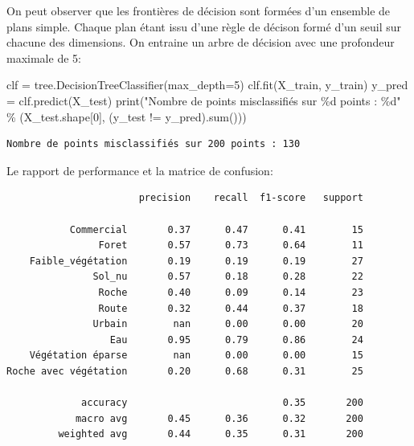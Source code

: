 \documentclass[
  11pt,
  letterpaper,
  open=any,
  twoside=false,
  french]{scrbook}
\newenvironment{Shaded}{\begin{snugshade}}{\end{snugshade}}
\newcommand{\BuiltInTok}[1]{\textcolor[rgb]{0.00,0.23,0.31}{#1}}
\newcommand{\DecValTok}[1]{\textcolor[rgb]{0.68,0.00,0.00}{#1}}
\newcommand{\NormalTok}[1]{\textcolor[rgb]{0.00,0.23,0.31}{#1}}
\newcommand{\OperatorTok}[1]{\textcolor[rgb]{0.37,0.37,0.37}{#1}}
\newcommand{\SpecialCharTok}[1]{\textcolor[rgb]{0.37,0.37,0.37}{#1}}
\newcommand{\StringTok}[1]{\textcolor[rgb]{0.13,0.47,0.30}{#1}}
\begin{document}
On peut observer que les frontières de décision sont formées d'un
ensemble de plans simple. Chaque plan étant issu d'une règle de décison
formé d'un seuil sur chacune des dimensions. On entraine un arbre de
décision avec une profondeur maximale de 5:

\begin{Shaded}
\begin{Highlighting}[]
\NormalTok{clf }\OperatorTok{=}\NormalTok{ tree.DecisionTreeClassifier(max\_depth}\OperatorTok{=}\DecValTok{5}\NormalTok{)}
\NormalTok{clf.fit(X\_train, y\_train)}
\NormalTok{y\_pred }\OperatorTok{=}\NormalTok{ clf.predict(X\_test)}
\BuiltInTok{print}\NormalTok{(}\StringTok{"Nombre de points misclassifiés sur }\SpecialCharTok{\%d}\StringTok{ points : }\SpecialCharTok{\%d}\StringTok{"}
  \OperatorTok{\%}\NormalTok{ (X\_test.shape[}\DecValTok{0}\NormalTok{], (y\_test }\OperatorTok{!=}\NormalTok{ y\_pred).}\BuiltInTok{sum}\NormalTok{()))}
\end{Highlighting}
\end{Shaded}

\begin{verbatim}
Nombre de points misclassifiés sur 200 points : 130
\end{verbatim}

Le rapport de performance et la matrice de confusion:

\begin{verbatim}
                       precision    recall  f1-score   support

           Commercial       0.37      0.47      0.41        15
                Foret       0.57      0.73      0.64        11
    Faible_végétation       0.19      0.19      0.19        27
               Sol_nu       0.57      0.18      0.28        22
                Roche       0.40      0.09      0.14        23
                Route       0.32      0.44      0.37        18
               Urbain        nan      0.00      0.00        20
                  Eau       0.95      0.79      0.86        24
    Végétation éparse        nan      0.00      0.00        15
Roche avec végétation       0.20      0.68      0.31        25

             accuracy                           0.35       200
            macro avg       0.45      0.36      0.32       200
         weighted avg       0.44      0.35      0.31       200
\end{verbatim}
\end{document}
